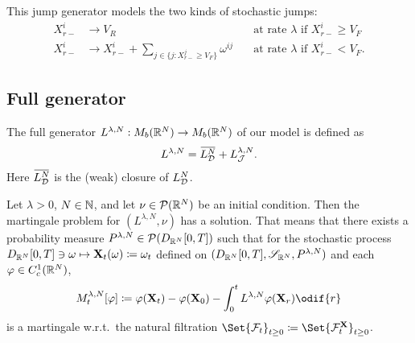 This jump generator models the two kinds of stochastic jumps:
\begin{align}
  X_{r-}^i & \to V_R                                                           & \quad\text{at rate } \lambda \text{ if } X_{r-}^i \geq V_F \\
  X_{r-}^i & \to X_{r-}^i + \sum_{j \in \{j : X_{r-}^j \geq V_F\}} \omega^{ij} & \quad\text{at rate } \lambda \text{ if } X_{r-}^i < V_F.
\end{align}


\subsection{Full generator}

The full generator \(L^{\lambda, N} : M_b(\mathbb{R}^N) \to M_b(\mathbb{R}^N)\) of our model is defined as
\begin{equation}
  L^{\lambda, N} = \ol{L_{\cD}^{N}} + L_{\cJ}^{\lambda, N}.
\end{equation}
Here \(\ol{L_{\cD}^{N}}\) is the (weak) closure of \(L_{\mathcal{D}}^N\). %


\begin{theorem}\label{thm:mart-problem-sol}
  Let \(\lambda > 0\), \( N \in \mathbb{N} \), and let \(\nu \in \mathcal{P}(\mathbb{R}^N)\) be an initial condition.
  Then the martingale problem for \((L^{\lambda, N}, \nu)\) has a solution.%
  That means that there exists a probability measure \(P^{\lambda, N} \in \mathcal{P}(D_{\mathbb{R}^N}[0,T])\) such that for the stochastic process \(D_{\mathbb{R}^N}[0,T] \ni \mathbf{\omega} \mapsto \mathbf{X}_t(\mathbf{\omega}) \coloneqq \mathbf{\omega}_t\) defined on \((D_{\mathbb{R}^N}[0,T], \mathscr{S}_{\mathbb{R}^N}, P^{\lambda, N})\) and each \(\varphi \in C_c^1(\mathbb{R}^N)\), %
  \begin{equation}\label{eq:M-def}
    M_t^{\lambda, N}[\varphi]
    \coloneqq \varphi(\bm{X}_t) - \varphi(\bm{X}_0) - \int_0^t L^{\lambda, N} \varphi(\bm{X}_r) \odif{r}
  \end{equation}
  is a martingale w.r.t.\ the natural filtration \(\Set{\cF_t}_{t\geq0} \coloneqq \Set{\cF_t^\bm{X}}_{t\geq0}\).    %
\end{theorem}

